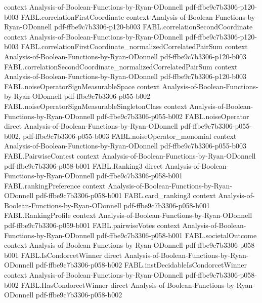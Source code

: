 \begin{theorem}
  {context}
  {Analysis-of-Boolean-Functions-by-Ryan-ODonnell}
  {pdf-ffbe9c7b3306-p120-b003}
\proofstep
  {FABL.correlationFirstCoordinate}
  {context}
  {Analysis-of-Boolean-Functions-by-Ryan-ODonnell}
  {pdf-ffbe9c7b3306-p120-b003}
\proofstep
  {FABL.correlationSecondCoordinate}
  {context}
  {Analysis-of-Boolean-Functions-by-Ryan-ODonnell}
  {pdf-ffbe9c7b3306-p120-b003}
\proofstep
  {FABL.correlationFirstCoordinate_normalizedCorrelatedPairSum}
  {context}
  {Analysis-of-Boolean-Functions-by-Ryan-ODonnell}
  {pdf-ffbe9c7b3306-p120-b003}
\proofstep
  {FABL.correlationSecondCoordinate_normalizedCorrelatedPairSum}
  {context}
  {Analysis-of-Boolean-Functions-by-Ryan-ODonnell}
  {pdf-ffbe9c7b3306-p120-b003}
\proofstep
  {FABL.noiseOperatorSignMeasurableSpace}
  {context}
  {Analysis-of-Boolean-Functions-by-Ryan-ODonnell}
  {pdf-ffbe9c7b3306-p055-b002}
\proofstep
  {FABL.noiseOperatorSignMeasurableSingletonClass}
  {context}
  {Analysis-of-Boolean-Functions-by-Ryan-ODonnell}
  {pdf-ffbe9c7b3306-p055-b002}
\proofstep
  {FABL.noiseOperator}
  {direct}
  {Analysis-of-Boolean-Functions-by-Ryan-ODonnell}
  {pdf-ffbe9c7b3306-p055-b002,
    pdf-ffbe9c7b3306-p055-b003}
\proofstep
  {FABL.noiseOperator_monomial}
  {context}
  {Analysis-of-Boolean-Functions-by-Ryan-ODonnell}
  {pdf-ffbe9c7b3306-p055-b003}
\proofstep
  {FABL.PairwiseContest}
  {context}
  {Analysis-of-Boolean-Functions-by-Ryan-ODonnell}
  {pdf-ffbe9c7b3306-p058-b001}
\proofstep
  {FABL.Ranking3}
  {direct}
  {Analysis-of-Boolean-Functions-by-Ryan-ODonnell}
  {pdf-ffbe9c7b3306-p058-b001}
\proofstep
  {FABL.rankingPreference}
  {context}
  {Analysis-of-Boolean-Functions-by-Ryan-ODonnell}
  {pdf-ffbe9c7b3306-p058-b001}
\proofstep
  {FABL.card_ranking3}
  {context}
  {Analysis-of-Boolean-Functions-by-Ryan-ODonnell}
  {pdf-ffbe9c7b3306-p058-b001}
\proofstep
  {FABL.RankingProfile}
  {context}
  {Analysis-of-Boolean-Functions-by-Ryan-ODonnell}
  {pdf-ffbe9c7b3306-p059-b001}
\proofstep
  {FABL.pairwiseVotes}
  {context}
  {Analysis-of-Boolean-Functions-by-Ryan-ODonnell}
  {pdf-ffbe9c7b3306-p058-b001}
\proofstep
  {FABL.societalOutcome}
  {context}
  {Analysis-of-Boolean-Functions-by-Ryan-ODonnell}
  {pdf-ffbe9c7b3306-p058-b001}
\proofstep
  {FABL.IsCondorcetWinner}
  {direct}
  {Analysis-of-Boolean-Functions-by-Ryan-ODonnell}
  {pdf-ffbe9c7b3306-p058-b002}
\proofstep
  {FABL.instDecidableIsCondorcetWinner}
  {context}
  {Analysis-of-Boolean-Functions-by-Ryan-ODonnell}
  {pdf-ffbe9c7b3306-p058-b002}
\proofstep
  {FABL.HasCondorcetWinner}
  {direct}
  {Analysis-of-Boolean-Functions-by-Ryan-ODonnell}
  {pdf-ffbe9c7b3306-p058-b002}

\end{theorem}
